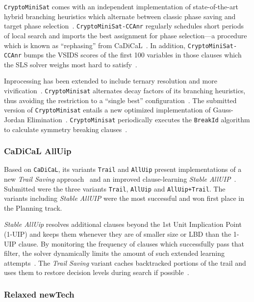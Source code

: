 \documentclass{elsarticle}
\newcommand{\solver}[1]{\texttt{#1}}
\begin{document}
\solver{CryptoMiniSat} comes with an independent implementation of state-of-the-art hybrid branching heuristics which alternate between classic phase saving and target phase selection~\cite{Biere:SC2019}.
\solver{CryptoMiniSat-CCAnr} regularly schedules short periods of local search and imports the best assignment for phase selection---a procedure which is known as ``rephasing'' from CaDiCaL~\cite{Biere:SC2019}.
In addition, \solver{CryptoMiniSat-CCAnr} bumps the VSIDS scores of the first 100 variables in those clauses which the SLS solver weighs most hard to satisfy~\cite{Soos:SC2020}.

Inprocessing has been extended to include ternary resolution and more vivification~\cite{ChuMinLi:2020:Vivification}. 
\solver{CryptoMinisat} alternates decay factors of its branching heuristics, thus avoiding the restriction to a ``single best'' configuration~\cite{Soos:SC2020}. 
The submitted version of \solver{CryptoMinisat} entails a new optimized implementation of Gauss-Jordan Elimination~\cite{Soos:2020:CNFXOR}. 
\solver{CryptoMinisat} periodically executes the \solver{BreakId} algorithm to  calculate symmetry breaking clauses~\cite{Devriendt:2016:BreakId}.


\subsubsection{CaDiCaL AllUip}

Based on \solver{CaDiCaL}, its variants \solver{Trail} and \solver{AllUip} present implementations of a new \emph{Trail Saving} approach~\cite{Hickey:2020:TrailSaving} 
and an improved clause-learning \emph{Stable AllUIP}~\cite{Bacchus:SC2020}. 
Submitted were the three variants \solver{Trail}, \solver{AllUip} and \solver{AllUip+Trail}. 
The variants including \emph{Stable AllUIP} were the most successful and won  first place in the Planning track. 

\emph{Stable AllUip} resolves additional clauses beyond the 1st Unit Implication Point (1-UIP) and keeps them whenever they are of smaller size or LBD than the 1-UIP clause. 
By monitoring the frequency of clauses which successfully pass that filter, the solver dynamically limits the amount of such extended learning attempts~\cite{Zhang:2001:ClauseLearning,Bacchus:SC2020}.
The \emph{Trail Saving} variant caches backtracked portions of the trail and uses them to restore decision levels during search if possible~\cite{Hickey:2020:TrailSaving}. 


\subsubsection{Relaxed newTech}
\end{document}
